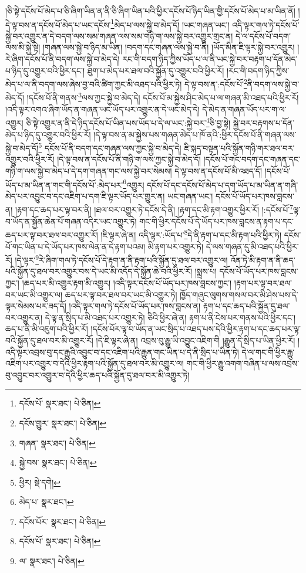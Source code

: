 །ཅི་སྟེ་དངོས་པོ་མེད་པ་ཅི་ཞིག་ཡིན་ན་ནི་ཅི་ཞིག་ཡིན་པའི་ཕྱིར་དངོས་པོ་ཉིད་ཡིན་གྱི་དངོས་པོ་མེད་པ་མ་ཡིན་ནོ། །དེ་ལྟ་བས་ན་དངོས་པོ་མེད་པ་ཡང་དངོས་\footnote{དངོས་པོ་  སྣར་ཐང་།  པེ་ཅིན། }མེད་པ་ལས་སྐྱེ་བ་མེད་དོ། །ཡང་གཞན་ཡང་། འདི་ལྟར་གལ་ཏེ་དངོས་པོ་སྐྱེ་བར་འགྱུར་ན་དེ་བདག་ལས་སམ་གཞན་ལས་སམ་གཉི་ག་ལས་སྐྱེ་བར་འགྱུར་གྲང་ན། དེ་ལ་དངོས་པོ་བདག་ལས་མི་སྐྱེ་སྟེ། །གཞན་ལས་སྐྱེ་བ་ཉིད་མ་ཡིན། །བདག་དང་གཞན་ལས་སྐྱེ་བ་ནི། །ཡོད་མིན་ཇི་ལྟར་སྐྱེ་བར་འགྱུར། །རེ་ཞིག་དངོས་པོ་ནི་བདག་ལས་སྐྱེ་བ་མེད་དེ། རང་གི་བདག་ཉིད་ཀྱིས་ཡོད་པ་ལ་ནི་ཡང་སྐྱེ་བར་བརྟག་པ་དོན་མེད་པ་ཉིད་དུ་འགྱུར་བའི་ཕྱིར་དང་། ཐུག་པ་མེད་པར་ཐལ་བའི་སྐྱོན་དུ་འགྱུར་བའི་ཕྱིར་རོ། །རང་གི་བདག་ཉིད་ཀྱིས་མེད་པ་ལ་ནི་བདག་ལས་ཞེས་བྱ་བའི་ཚིག་ཀྱང་མི་འཐད་པའི་ཕྱིར་ཏེ། དེ་ལྟ་བས་ན་:དངོས་པོ་\footnote{དངོས་གྱུར་  སྣར་ཐང་།  པེ་ཅིན། }ནི་བདག་ལས་སྐྱེ་བ་མེད་དོ། །དངོས་པོ་ནི་གནས་\footnote{གཞན་  སྣར་ཐང་།  པེ་ཅིན། }ལས་ཀྱང་སྐྱེ་བ་མེད་དེ། དངོས་པོ་མ་སྐྱེས་ཤིང་མེད་པ་ལ་གཞན་མི་འཐད་པའི་ཕྱིར་རོ། །འདི་ལྟར་འགའ་ཞིག་ཡོད་ན་གཞན་ཡང་ཡོད་པར་འགྱུར་ན་དེ་ཡང་མེད་དེ། དེ་མེད་ན་གཞན་ཡོད་པར་ག་ལ་འགྱུར། ཅི་སྟེ་འགྱུར་ན་ནི་དེ་ཉིད་དངོས་པོ་ཡིན་པས་ཡོད་པ་དེ་ལ་ཡང་:སྐྱེ་བར་\footnote{སྐྱེ་བས་  སྣར་ཐང་།  པེ་ཅིན། }ཅི་བྱ་སྟེ། སྐྱེ་བར་བརྟགས་པ་དོན་མེད་པ་ཉིད་དུ་འགྱུར་བའི་ཕྱིར་རོ། །དེ་ལྟ་བས་ན་མ་སྐྱེས་པས་གཞན་མེད་པ་ཁོ་ནའི་:ཕྱིར་དངོས་པོ་ནི་གཞན་ལས་སྐྱེ་བ་མེད་དོ།\footnote{ཕྱིར།  སྡེ་དགེ། } དངོས་པོ་ནི་བདག་དང་གཞན་ལས་ཀྱང་སྐྱེ་བ་མེད་དེ། ཇི་སྐད་བསྟན་པའི་སྐྱོན་གཉི་གར་ཐལ་བར་འགྱུར་བའི་ཕྱིར་རོ། །དེ་ལྟ་བས་ན་དངོས་པོ་ནི་གཉི་ག་ལས་ཀྱང་སྐྱེ་བ་མེད་དོ། །དངོས་པོ་གང་བདག་དང་གཞན་དང་གཉི་ག་ལས་སྐྱེ་བ་མེད་པ་དེ་དག་གཞན་གང་ལས་སྐྱེ་བར་སེམས། དེ་ལྟ་བས་ན་དངོས་པོ་མི་འཐད་དོ། །དངོས་པོ་ཡོད་པ་མ་ཡིན་ན་གང་གི་དངོས་པོ་:མེད་པར་\footnote{མེད་པ་  སྣར་ཐང་། }འགྱུར། དངོས་པོ་དང་དངོས་པོ་མེད་པ་དག་ཡོད་པ་མ་ཡིན་ན་གཞི་མེད་པར་འབྱུང་བ་དང་འཇིག་པ་དག་ཇི་ལྟར་ཡོད་པར་གྱུར་ན། ཡང་གཞན་ཡང་། དངོས་པོ་ཡོད་པར་ཁས་བླངས་ན། །རྟག་དང་ཆད་པར་ལྟ་བར་ནི། །ཐལ་བར་འགྱུར་ཏེ་དངོས་དེ་ནི། །རྟག་དང་མི་རྟག་འགྱུར་ཕྱིར་རོ། །:དངོས་པོ་\footnote{དངོས་པོར་  སྣར་ཐང་།  པེ་ཅིན། }ལྟ་བ་ཡོད་ན་སྐྱོན་ཆེན་པོ་གཞན་འདིར་ཡང་འགྱུར་ཏེ། གང་གི་ཕྱིར་དངོས་པོ་དེ་ཡོད་པར་ཁས་བླངས་ན་རྟག་པ་དང་ཆད་པར་ལྟ་བར་ཐལ་བར་འགྱུར་རོ། །ཇི་ལྟར་ཞེ་ན། འདི་ལྟར་:ཡོད་པ་\footnote{དངོས་པོ་  སྣར་ཐང་།  པེ་ཅིན། }དེ་ནི་རྟག་པ་དང་མི་རྟག་པའི་ཕྱིར་ཏེ། དངོས་པོ་གང་ཡིན་པ་དེ་ཡོད་པར་ཁས་ལེན་ན་དེ་རྟག་པའམ། མི་རྟག་པར་འགྱུར་ཏེ། དེ་ལས་གཞན་དུ་མི་འཐད་པའི་ཕྱིར་རོ། །དེ་ལྟར་\footnote{ལ་  སྣར་ཐང་།  པེ་ཅིན། }རེ་ཞིག་གལ་ཏེ་དངོས་པོ་དེ་རྟག་ན་ནི་རྟག་པའི་སྐྱོན་དུ་ཐལ་བར་འགྱུར་ལ། འོན་ཏེ་མི་རྟག་ན་ནི་ཆད་པའི་སྐྱོན་དུ་ཐལ་བར་འགྱུར་བས་དེ་ཡང་མི་འདོད་དེ་སྐྱོན་ཆེ་བའི་ཕྱིར་རོ། །སྨྲས་པ། དངོས་པོ་ཡོད་པར་ཁས་བླངས་ཀྱང་། །ཆད་པར་མི་འགྱུར་རྟག་མི་འགྱུར། །འདི་ལྟར་དངོས་པོ་ཡོད་པར་ཁས་བླངས་ཀྱང་། །རྟག་པར་ལྟ་བར་ཐལ་བར་ཡང་མི་འགྱུར་ལ། ཆད་པར་ལྟ་བར་ཐལ་བར་ཡང་མི་འགྱུར་ཏེ། ཁྱོད་གཞུང་ལུགས་གསལ་བར་མི་ཤེས་པས་དེ་ལྟར་སེམས་པར་ཟད་དོ། །འདི་ལྟར་གལ་ཏེ་དངོས་པོ་ཡོད་པར་ཁས་བླངས་ན། རྟག་པ་དང་ཆད་པའི་སྐྱོན་དུ་ཐལ་བར་འགྱུར་ན། དེ་ལྟ་ན་སྲིད་པ་མི་འཐད་པར་འགྱུར་ཏེ། ཅིའི་ཕྱིར་ཞེ་ན། རྟག་པ་ནི་ངེས་པར་གནས་པའི་ཕྱིར་དང་། ཆད་པ་ནི་མི་འཇུག་པའི་ཕྱིར་རོ། །དངོས་པོར་ལྟ་བ་ཡོད་ན་ཡང་སྲིད་པ་འཐད་པས་དེའི་ཕྱིར་རྟག་པ་དང་ཆད་པར་ལྟ་བའི་སྐྱོན་དུ་ཐལ་བར་མི་འགྱུར་རོ། །དེ་ཇི་ལྟར་ཞེ་ན། འབྲས་བུ་རྒྱུ་ཡི་འབྱུང་འཇིག་གི །རྒྱུན་དེ་སྲིད་པ་ཡིན་ཕྱིར་རོ། །འདི་ལྟར་འབྲས་བུ་དང་རྒྱུའི་འབྱུང་བ་དང་འཇིག་པའི་རྒྱུན་གང་ཡིན་པ་དེ་ནི་སྲིད་པ་ཡིན་ཏེ། དེ་ལ་གང་གི་ཕྱིར་རྒྱུ་འཇིག་པར་འགྱུར་བ་དེའི་ཕྱིར་རྟག་པའི་སྐྱོན་དུ་ཐལ་བར་མི་འགྱུར་ལ། གང་གི་ཕྱིར་རྒྱུ་འགག་བཞིན་པ་ལས་འབྲས་བུ་འབྱུང་བར་འགྱུར་བ་དེའི་ཕྱིར་ཆད་པའི་སྐྱོན་དུ་ཐལ་བར་མི་འགྱུར་ཏེ། 